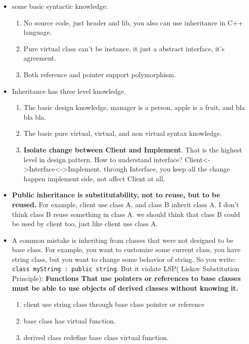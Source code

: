 \documentclass[a4paper,11pt,twoside]{book}
\begin{document}
\begin{itemize}
	\item some basic syntactic knowledge:
	\begin{enumerate}
		\item No source code, just header and lib, you also can use inheritance in C++ language.
		
		\item Pure virtual class can't be instance, it just a abstract interface, it's agreement.
		
		\item Both reference and pointer support polymorphism.
	\end{enumerate}
	
	\item Inheritance has three level knowledge.
	\begin{enumerate}
		\item The basic design knowledge, manager is a person, apple is a fruit, and bla bla bla.
		
		\item The basic  pure virtual, virtual, and non virtual syntax knowledge.
		
		\item \textbf{Isolate change between Client and Implement}. That is the highest level in design pattern. How to understand interface? Client<->Interface<->Implement. through Interface, you keep all the change happen implement side, not affect Client at all.
	\end{enumerate}
	
	\item \textbf{Public inheritance is substitutability, not to reuse, but to be reused. } For example, client use class A, and class B inherit class A.  I don't think class B reuse something in class A. we should think that class B could be used by client too, just like client use class A.

	
	\item  A common mistake is inheriting from classes that were not designed to be base class. For example, you want to customize some current class, you have string class, but you want to change some behavior of string. So you write: \texttt{class myString : public string}. But it violate LSP( Liskov Substitution Principle): \textbf{Functions That use pointers or references to base classes must be able to use objects of derived classes without knowing it. }
	\begin{enumerate}
		\item client use string class through base class pointer or reference
		\item base class has virtual function.
		\item derived class redefine base class virtual function.
	\end{enumerate}
	

\end{itemize}
\end{document}
